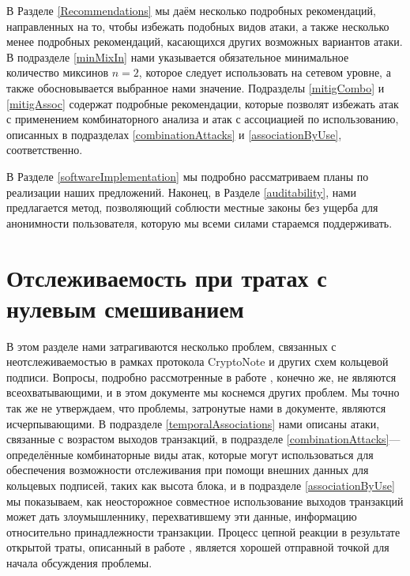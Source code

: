 \documentclass{mrl}
\begin{document}
В Разделе \ref{Recommendations} мы даём несколько подробных рекомендаций, направленных на то, чтобы избежать подобных видов атаки, а также несколько менее подробных рекомендаций, касающихся других возможных вариантов атаки. В подразделе \ref{minMixIn} нами указывается обязательное минимальное количество миксинов $n=2$, которое следует использовать на сетевом уровне, а также обосновывается выбранное нами значение. Подразделы \ref{mitigCombo} и \ref{mitigAssoc} содержат подробные рекомендации, которые позволят избежать атак с применением комбинаторного анализа и атак с ассоциацией по использованию, описанных в подразделах \ref{combinationAttacks} и \ref{associationByUse}, соответственно.

В Разделе \ref{softwareImplementation} мы подробно рассматриваем планы по реализации наших предложений. Наконец, в Разделе \ref{auditability}, нами предлагается метод, позволяющий соблюсти местные законы без ущерба для анонимности пользователя, которую мы всеми силами стараемся поддерживать.

\section{Отслеживаемость при тратах с нулевым смешиванием}\label{chainRxns}
В этом разделе нами затрагиваются несколько проблем, связанных с неотслеживаемостью в рамках протокола CryptoNote и других схем кольцевой подписи. Вопросы, подробно рассмотренные в работе \cite{chainReactions} , конечно же, не являются всеохватывающими, и в этом документе мы коснемся других проблем. Мы точно так же не утверждаем, что проблемы, затронутые нами в документе, являются исчерпывающими. В подразделе \ref{temporalAssociations} нами описаны атаки, связанные с возрастом выходов транзакций, в подразделе \ref{combinationAttacks}— определённые комбинаторные виды атак, которые могут использоваться для обеспечения возможности отслеживания при помощи внешних данных для кольцевых подписей, таких как высота блока, и в подразделе \ref{associationByUse} мы показываем, как неосторожное совместное использование выходов транзакций может дать злоумышленнику, перехватившему эти данные, информацию относительно принадлежности транзакции. Процесс цепной реакции в результате открытой траты, описанный в работе \cite{chainReactions}, является хорошей отправной точкой для начала обсуждения проблемы.
\end{document}
